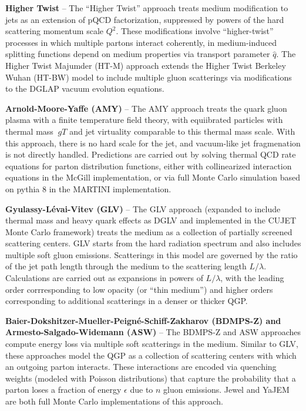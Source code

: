 \begin{itemize}
\item \textbf{Higher Twist} -- The ``Higher Twist'' approach treats medium modification to jets as an extension of pQCD factorization, suppressed by powers of the hard scattering momentum scale $Q^2$.  These modifications involve ``higher-twist'' processes in which multiple partons interact coherently, in medium-induced splitting functions depend on medium properties via transport parameter $\hat{q}$.  The Higher Twist Majumder (HT-M) approach extends the Higher Twist Berkeley Wuhan (HT-BW) model to include multiple gluon scatterings via modifications to the DGLAP vacuum evolution equations.   

\item \textbf{Arnold-Moore-Yaffe (AMY)} --  The AMY approach treats the quark gluon plasma with a finite temperature field theory, with equiibrated particles with thermal mass $~gT$ and jet virtuality comparable to this thermal mass scale.  With this approach, there is no hard scale for the jet, and vacuum-like jet fragmenation is not directly handled.  Predictions are carried out by solving thermal QCD rate equations for parton distribution functions, either with collinearized interaction equations in the McGill implementation, or via full Monte Carlo simulation based on {\sc pythia 8} in the MARTINI implementation. 

\item \textbf{Gyulassy-L\'{e}vai-Vitev (GLV)} -- The GLV approach (expanded to include thermal mass and heavy quark effects as DGLV and implemented in the {\sc CUJET} Monte Carlo framework) treats the medium as a collection of partially screened scattering centers. GLV starts from the hard radiation spectrum and also includes multiple soft gluon emissions.  Scatterings in this model are governed by the ratio of the jet path length through the medium to the scattering length $L/\lambda$.  Calculations are carried out as expansions in powers of $L/\lambda$, with the leading order corrresponding to low opacity (or ``thin medium'') and higher orders corresponding to additional scatterings in a denser or thicker QGP.
\begin{sloppypar}

\item \textbf{Baier-Dokshitzer-Mueller-Peign\'{e}-Schiff-Zakharov (BDMPS-Z) and Armesto-Salgado-Widemann (ASW)} -- The BDMPS-Z and ASW approaches compute energy loss via multiple soft scatterings in the medium.  Similar to GLV, these approaches model the QGP as a collection of scattering centers with which an outgoing parton interacts.  These interactions are encoded via quenching weights (modeled with Poisson distributions) that capture the probability that a parton loses a fraction of energy $\epsilon$ due to $n$ gluon emissions.  {\sc Jewel} and {\sc YaJEM} are both full Monte Carlo implementations of this approach.
\end{sloppypar}


\end{itemize}

